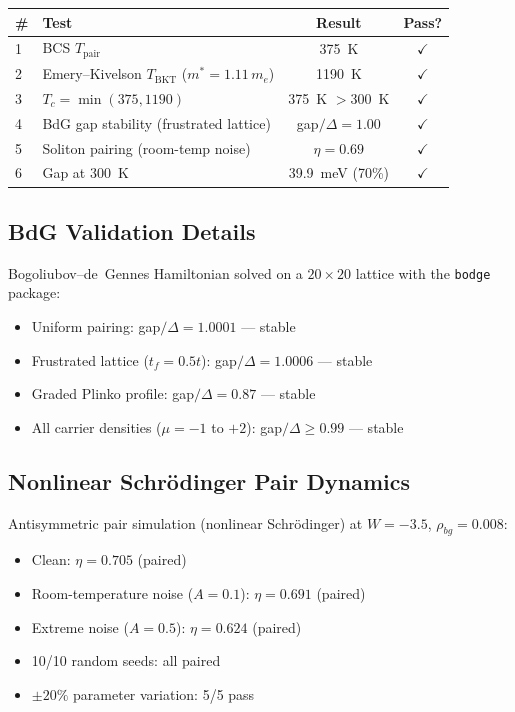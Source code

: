 \documentclass[11pt, a4paper]{article}
\begin{document}
\begin{center}
\begin{tabular}{@{}llcc@{}}
\toprule
\textbf{\#} & \textbf{Test} & \textbf{Result} & \textbf{Pass?} \\
\midrule
1 & BCS $T_{\text{pair}}$ & 375~K & $\checkmark$ \\
2 & Emery--Kivelson $T_{\text{BKT}}$ ($m^* = 1.11\,m_e$) & 1190~K &
  $\checkmark$ \\
3 & $T_c = \min(375, 1190)$ & 375~K $> 300$~K & $\checkmark$ \\
4 & BdG gap stability (frustrated lattice) & gap$/\Delta = 1.00$ &
  $\checkmark$ \\
5 & Soliton pairing (room-temp noise) & $\eta = 0.69$ &
  $\checkmark$ \\
6 & Gap at 300~K & 39.9~meV (70\%) & $\checkmark$ \\
\bottomrule
\end{tabular}
\end{center}

\subsection{BdG Validation Details}

Bogoliubov--de~Gennes Hamiltonian solved on a $20 \times 20$
lattice with the \texttt{bodge} package:

\begin{itemize}[nosep]
  \item Uniform pairing: gap$/\Delta = 1.0001$ --- stable
  \item Frustrated lattice ($t_f = 0.5t$): gap$/\Delta = 1.0006$
        --- stable
  \item Graded Plinko profile: gap$/\Delta = 0.87$ --- stable
  \item All carrier densities ($\mu = -1$ to $+2$): gap$/\Delta
        \geq 0.99$ --- stable
\end{itemize}

\subsection{Nonlinear Schr\"odinger Pair Dynamics}

Antisymmetric pair simulation (nonlinear Schr\"odinger) at $W = -3.5$,
$\rho_{bg} = 0.008$:

\begin{itemize}[nosep]
  \item Clean: $\eta = 0.705$ (paired)
  \item Room-temperature noise ($A = 0.1$): $\eta = 0.691$ (paired)
  \item Extreme noise ($A = 0.5$): $\eta = 0.624$ (paired)
  \item 10/10 random seeds: all paired
  \item $\pm 20\%$ parameter variation: 5/5 pass
\end{itemize}
\end{document}
